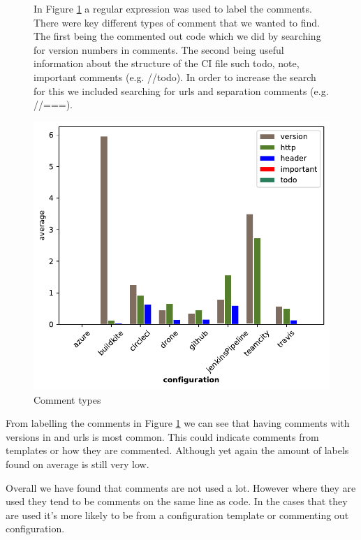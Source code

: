 \documentclass[twoside,12pt,titlepage,a4paper]{article}
\begin{document}
\begin{figure}[!ht]
  \centering
  \begin{minipage}[!t]{.48\textwidth}
    In Figure \ref{fig:comment_types} a regular expression was used to label the comments. There were key different types of comment that we wanted to find. The first being the commented out code which we did by searching for version numbers in comments. The second being useful information about the structure of the CI file such todo, note, important comments (e.g. //todo). In order to increase the search for this we included searching for urls and separation comments (e.g. //===).
    
  \end{minipage}%
  \hfill
  \begin{minipage}[!t]{.48\textwidth}
    \includegraphics[width=\textwidth]{../src/results/comments usage bars.pdf}
    \caption[alt text]{Comment types}
    \label{fig:comment_types}  
  \end{minipage}
\end{figure}

From labelling the comments in Figure \ref{fig:comment_types} we can see that having comments with versions in and urls is most common. This could indicate comments from templates or how they are commented. Although yet again the amount of labels found on average is still very low.

Overall we have found that comments are not used a lot. However where they are used they tend to be comments on the same line as code. In the cases that they are used it's more likely to be from a configuration template or commenting out configuration. 
\end{document}
